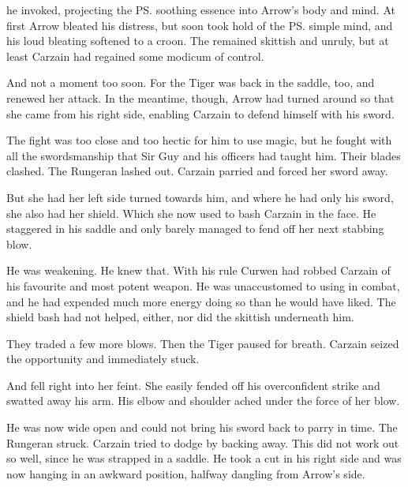 \ta{\Omariel,} he invoked, projecting the \ps{\sephirah} soothing essence into Arrow's body and mind. 
At first Arrow bleated his distress, but soon \Omariel{} took hold of the \ps{\relc}{} simple mind, and his loud bleating softened to a croon. 
The \relc{} remained skittish and unruly, but at least Carzain had regained some modicum of control. 

And not a moment too soon. 
For the Tiger was back in the saddle, too, and renewed her attack. 
In the meantime, though, Arrow had turned around so that she came from his right side, enabling Carzain to defend himself with his sword. 


The fight was too close and too hectic for him to use magic, but he fought with all the swordsmanship that Sir Guy and his officers had taught him. 
Their blades clashed. 
The Rungeran lashed out. 
Carzain parried and forced her sword away. 

But she had her left side turned towards him, and where he had only his sword, she also had her shield. 
Which she now used to bash Carzain in the face. 
He staggered in his saddle and only barely managed to fend off her next stabbing blow. 

He was weakening. 
He knew that. 
With his  rule Curwen had robbed Carzain of his favourite and most potent weapon.
He was unaccustomed to using \Keshirah{} in combat, and he had expended much more energy doing so than he would have liked. 
The shield bash had not helped, either, nor did the skittish \relc{} underneath him. 

They traded a few more blows. 
Then the Tiger paused for breath. 
Carzain seized the opportunity and immediately stuck. 

And fell right into her feint. 
She easily fended off his overconfident strike and swatted away his arm. 
His elbow and shoulder ached under the force of her blow. 


He was now wide open and could not bring his sword back to parry in time.
The Rungeran struck. 
Carzain tried to dodge by backing away. 
This did not work out so well, since he was strapped in a saddle. 
He took a cut in his right side and was now hanging in an awkward position, halfway dangling from Arrow's side. 

